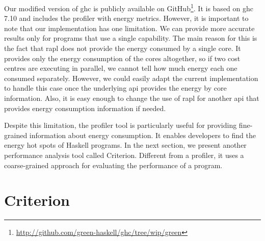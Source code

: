 Our modified version of \ac{ghc} is publicly available on GitHub\footnote{\url{http://github.com/green-haskell/ghc/tree/wip/green}}. It is based on \ac{ghc} 7.10 and includes the profiler with energy metrics. However, it is important to note that our implementation has one limitation. We can provide more accurate results only for programs that use a single capability. The main reason for this is the fact that \ac{rapl} does not provide the energy consumed by a single core. It provides only the energy consumption of the cores altogether, so if two cost centres are executing in parallel, we cannot tell how much energy each one consumed separately. However, we could easily adapt the current implementation to handle this case once the underlying \ac{api} provides the energy by core information. Also, it is easy enough to change the use of \ac{rapl} for another \ac{api} that provides energy consumption information if needed.

Despite this limitation, the profiler tool is particularly useful for providing fine-grained information about energy consumption. It enables developers to find the energy hot spots of Haskell programs. In the next section, we present another performance analysis tool called Criterion. Different from a profiler, it uses a coarse-grained approach for evaluating the performance of a program.


\section{Criterion}\label{sec:criterion}
\lipsum[1-4]
